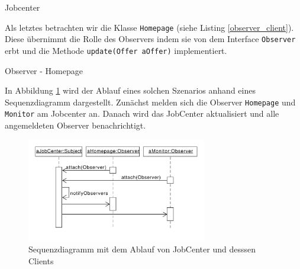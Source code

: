\begin{listing}[h!]
   \centering
   \caption{Jobcenter}
    \label{observer_jobcenter}
\end{listing} 

Als letztes betrachten wir die Klasse \texttt{Homepage} (siehe Listing \ref{observer_client}). Diese übernimmt die Rolle des Observers indem sie von dem Interface \texttt{Observer} erbt und die Methode \texttt{update(Offer aOffer)} implementiert. 

\begin{listing}[h!]
   \centering
   \caption{Observer - Homepage}
    \label{observer_client}
\end{listing}

In Abbildung \ref{observer_sequenz} wird der Ablauf eines solchen Szenarios anhand eines Sequenzdiagramm dargestellt. Zunächst melden sich die Observer \texttt{Homepage} und \texttt{Monitor} am Jobcenter an. Danach wird das JobCenter aktualisiert und alle angemeldeten Observer benachrichtigt.

\begin{figure}[h!]
\centering
\includegraphics[width=0.7\textwidth]{./paper/observer/observer_sequenz}
\caption{Sequenzdiagramm mit dem Ablauf von JobCenter und desssen Clients}
\label{observer_sequenz}
\end{figure} 